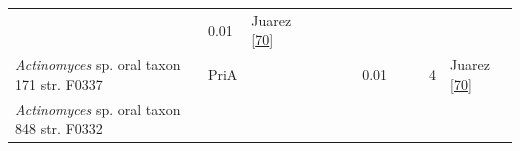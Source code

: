 \documentclass[12pt,twoside]{reedthesis}
\begin{document}
\begin{longtable}[]{@{}lllllllllll@{}}
\begin{minipage}[t]{0.05\columnwidth}
  \end{minipage} & \begin{minipage}[t]{0.03\columnwidth}\raggedright\strut
  0.01\strut
  \end{minipage} & \begin{minipage}[t]{0.11\columnwidth}\raggedright\strut
  Juarez
  {[}\protect\hyperlink{ref-juarez-vazquez_evolution_2017}{70}{]}\strut
  \end{minipage}\tabularnewline
  \begin{minipage}[t]{0.15\columnwidth}\raggedright\strut
  \emph{Actinomyces} sp. oral taxon 171 str. F0337\strut
  \end{minipage} & \begin{minipage}[t]{0.05\columnwidth}\raggedright\strut
  PriA\strut
  \end{minipage} & \begin{minipage}[t]{0.04\columnwidth}\raggedright\strut
  \strut
  \end{minipage} & \begin{minipage}[t]{0.04\columnwidth}\raggedright\strut
  \strut
  \end{minipage} & \begin{minipage}[t]{0.06\columnwidth}\raggedright\strut
  \strut
  \end{minipage} & \begin{minipage}[t]{0.06\columnwidth}\raggedright\strut
  \strut
  \end{minipage} & \begin{minipage}[t]{0.06\columnwidth}\raggedright\strut
  0.01\strut
  \end{minipage} & \begin{minipage}[t]{0.05\columnwidth}\raggedright\strut
  \strut
  \end{minipage} & \begin{minipage}[t]{0.05\columnwidth}\raggedright\strut
  \strut
  \end{minipage} & \begin{minipage}[t]{0.03\columnwidth}\raggedright\strut
  4\strut
  \end{minipage} & \begin{minipage}[t]{0.11\columnwidth}\raggedright\strut
  Juarez
  {[}\protect\hyperlink{ref-juarez-vazquez_evolution_2017}{70}{]}\strut
  \end{minipage}\tabularnewline
  \begin{minipage}[t]{0.15\columnwidth}\raggedright\strut
  \emph{Actinomyces} sp. oral taxon 848 str. F0332\strut
  \end{minipage} & \begin{minipage}[t]{0.05\columnwidth}\raggedright\strut

\end{minipage}
\end{longtable}
\end{document}
